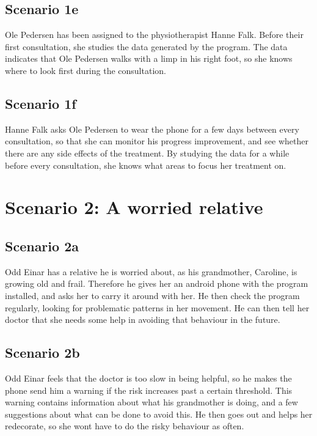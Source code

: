 \subsection*{Scenario 1e}

Ole Pedersen has been assigned to the physiotherapist Hanne Falk. Before their first consultation, she studies the data generated by the program. The data indicates that Ole Pedersen walks with a limp in his right foot, so she knows where to look first during the consultation.

\subsection*{Scenario 1f}

Hanne Falk asks Ole Pedersen to wear the phone for a few days between every consultation, so that she can monitor his progress improvement, and see whether there are any side effects of the treatment. By studying the data for a while before every consultation, she knows what areas to focus her treatment on.

\section{Scenario 2: A worried relative}


\subsection*{Scenario 2a}

Odd Einar has a relative he is worried about, as his grandmother, Caroline, is growing old and frail. Therefore he gives her an android phone with the program installed, and asks her to carry it around with her. He then check the program regularly, looking for problematic patterns in her movement. He can then tell her doctor that she needs some help in avoiding that behaviour in the future.

\subsection*{Scenario 2b}
Odd Einar feels that the doctor is too slow in being helpful, so he makes the phone send him a warning if the risk increases past a certain threshold. This warning contains information about what his grandmother is doing, and a few suggestions about what can be done to avoid this. He then goes out and helps her redecorate, so she wont have to do the risky behaviour as often. 

